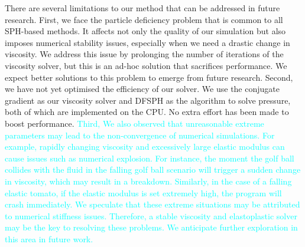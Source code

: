 \documentclass[10pt,journal,compsoc]{IEEEtran}
\newcommand{\revised}[1]{{\textcolor{cyan}{#1}}}
\begin{document}
There are several limitations to our method that can be addressed in future research. 
First, we face the particle deficiency problem that is common to all SPH-based methods. It affects not only the quality of our simulation but also imposes numerical stability issues, especially when we need a drastic change in viscosity. We address this issue by prolonging the number of iterations of the viscosity solver, but this is an ad-hoc solution that sacrifices performance. We expect better solutions to this problem to emerge from future research. Second, we have not yet optimised the efficiency of our solver. We use the conjugate gradient as our viscosity solver and DFSPH as the algorithm to solve pressure, both of which are implemented on the CPU. No extra effort has been made to boost performance. 
\revised{Third, We also observed that unreasonable extreme parameters may lead to the non-convergence of numerical simulations. For example, rapidly changing viscosity and excessively large elastic modulus can cause issues such as numerical explosion.} 
\revised{For instance, the moment the golf ball collides with the fluid in the falling golf ball scenario will trigger a sudden change in viscosity, which may result in a breakdown. Similarly, in the case of a falling elastic tomato, if the elastic modulus is set extremely high, the program will crash immediately. We speculate that these extreme situations may be attributed to numerical stiffness issues. Therefore, a stable viscosity and elastoplastic solver may be the key to resolving these problems. We anticipate further exploration in this area in future work.}
\end{document}

